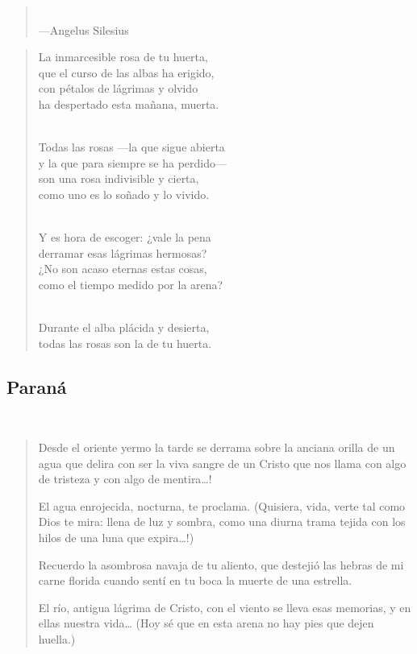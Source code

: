 \documentclass[a4paper, 12pt]{article}
\begin{document}
\begin{quote}
   
\scriptsize
{}\\
\hspace*{\fill}—Angelus Silesius
\end{quote}
\normalsize
\begin{verse}
    

La inmarcesible rosa de tu huerta,\\
que el curso de las albas ha erigido,\\
con pétalos de lágrimas y olvido\\
ha despertado esta mañana, muerta.\\
~ 

Todas las rosas —la que sigue abierta\\
y la que para siempre se ha perdido—\\
son una rosa indivisible y cierta,\\
como uno es lo soñado y lo vivido.\\
~ 

Y es hora de escoger: ¿vale la pena\\
derramar esas lágrimas hermosas?\\
¿No son acaso eternas estas cosas,\\
como el tiempo medido por la arena?\\
~ 

Durante el alba plácida y desierta,\\
todas las rosas son la de tu huerta.\\

\end{verse}

\pagebreak 
\subsection{Paraná}
~ 

\begin{verse}
Desde el oriente yermo la tarde se derrama
sobre la anciana orilla de un agua que delira
con ser la viva sangre de un Cristo que nos llama
con algo de tristeza y con algo de mentira…!
~

El agua enrojecida, nocturna, te proclama.
(Quisiera, vida, verte tal como Dios te mira:
llena de luz y sombra, como una diurna trama
tejida con los hilos de una luna que expira…!)
~

Recuerdo la asombrosa navaja de tu aliento,
que destejió las hebras de mi carne florida
cuando sentí en tu boca la muerte de una estrella.
~

El río, antigua lágrima de Cristo, con el viento
se lleva esas memorias, y en ellas nuestra vida…
(Hoy sé que en esta arena no hay pies que dejen huella.)
\end{verse}
\end{document}
